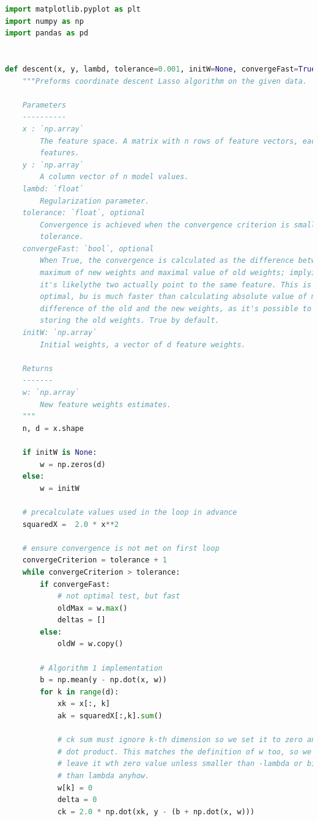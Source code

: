 \documentclass{article}
\newcommand{\1}{\mathbf{1}}
\begin{document}
\begin{enumerate}
    
\newpage
\begin{lstlisting}[language=Python]
import matplotlib.pyplot as plt
import numpy as np
import pandas as pd


def descent(x, y, lambd, tolerance=0.001, initW=None, convergeFast=True):
    """Preforms coordinate descent Lasso algorithm on the given data.

    Parameters
    ----------
    x : `np.array`
        The feature space. A matrix with n rows of feature vectors, each with d
        features.
    y : `np.array`
        A column vector of n model values.
    lambd: `float`
        Regularization parameter.
    tolerance: `float`, optional
        Convergence is achieved when the convergence criterion is smaller than
        tolerance.
    convergeFast: `bool`, optional
        When True, the convergence is calculated as the difference between
        maximum of new weights and maximal value of old weights; implying that
        it's likelythe two actually point to the same feature. This is not
        optimal, bu is much faster than calculating absolute value of minimal
        difference of the old and the new weights, as it's possible to avoid
        storing the old weights. True by default.
    initW: `np.array`
        Initial weights, a vector of d feature weights.

    Returns
    -------
    w: `np.array`
        New feature weights estimates. 
    """
    n, d = x.shape

    if initW is None:
        w = np.zeros(d)
    else:
        w = initW

    # precalculate values used in the loop in advance
    squaredX =  2.0 * x**2

    # ensure convergence is not met on first loop
    convergeCriterion = tolerance + 1
    while convergeCriterion > tolerance:
        if convergeFast:
            # not optimal test, but fast
            oldMax = w.max()
            deltas = []
        else:
            oldW = w.copy()

        # Algorithm 1 implementation
        b = np.mean(y - np.dot(x, w))
        for k in range(d):
            xk = x[:, k]
            ak = squaredX[:,k].sum()

            # ck sum must ignore k-th dimension so we set it to zero and use
            # dot product. This matches the definition of w too, so we can
            # leave it wth zero value unless smaller than -lambda or bigger
            # than lambda anyhow. 
            w[k] = 0
            delta = 0
            ck = 2.0 * np.dot(xk, y - (b + np.dot(x, w)))


\end{lstlisting}
\end{enumerate}
\end{document}
